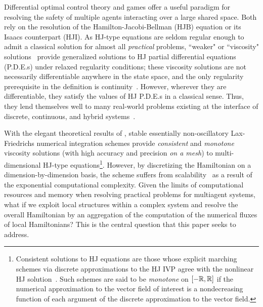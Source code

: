 Differential optimal control theory and games offer a useful paradigm for resolving the safety of multiple agents interacting over a large shared space. Both rely on the resolution of the Hamilton-Jacobi-Bellman (HJB) equation or its Isaacs counterpart (HJI).  As HJ-type equations are seldom regular enough to admit a classical solution for almost all \textit{practical} problems, ``weaker" or ``viscosity" solutions~\cite{Lions1982, Evans1984, Crandall1984} provide generalized  solutions to HJ partial differential equations (P.D.E.s) under relaxed regularity conditions; these viscosity solutions are not necessarily differentiable anywhere in the state space, and the only regularity prerequisite in the definition is continuity~\cite{Crandall1983viscosity}. However, wherever they are differentiable, they satisfy the  values of HJ P.D.E.s in a classical sense. Thus, they lend themselves well to many real-world problems existing at the interface of discrete, continuous, and hybrid systems~\cite{LygerosReachability,  Mitchell2020, Souganidis, Mitchell2005}.

With the elegant theoretical results of \cite{CrandallLaxFriedrichs, Crandall1984Approx, Evans1984, OsherShuENO, Crandall1984}, stable essentially non-oscillatory  Lax-Friedrichs numerical integration schemes provide  \textit{consistent} and \textit{monotone} viscosity solutions (with high accuracy and precision \textit{on a mesh}) to multi-dimensional HJ-type equations\footnote{Consistent solutions to HJ equations are those whose explicit marching schemes via discrete  approximations to the HJ IVP agree with the nonlinear HJ solution~\cite{Crandall1984Approx}. Such schemes are said to be \textit{monotone} \eg on $\left[-\mathbb{R}, \mathbb{R}\right]$ if the numerical approximation to the vector field of interest is a nondecreasing function of each argument of the discrete approximation to the vector field.}.
However, by discretizing the Hamiltonian on a dimension-by-dimension basis, the scheme suffers from scalability~\cite{SylviaScalability, Bajcsy, Bansal} as a result of the exponential computational complexity. Given the limits of computational resources and memory when resolving practical problems for multiagent systems, what if we exploit local structures within a complex system and resolve the overall Hamiltonian by an aggregation of the computation of the numerical fluxes of local Hamiltonians? This is the central question that this paper seeks to address.


